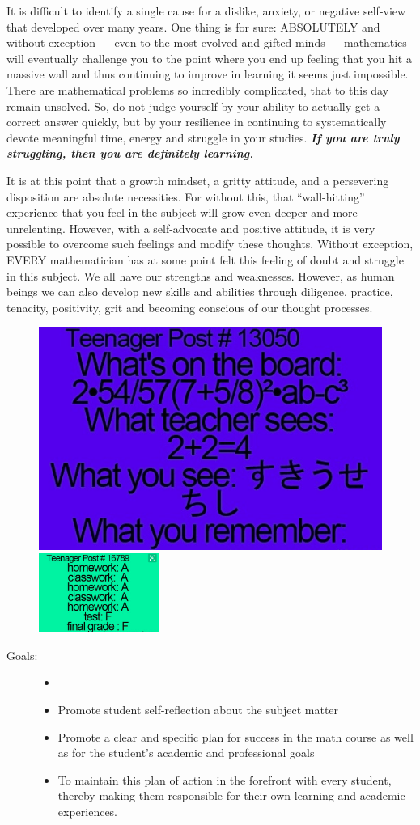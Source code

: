 \documentclass{article}
\begin{document}
It is difficult to identify a single cause for a dislike, anxiety, or negative self-view that developed over many years.  One thing is for sure: ABSOLUTELY and without exception --- even to the most evolved and gifted minds --- mathematics will eventually challenge you to the point where you end up feeling that you hit a massive wall and thus continuing to improve in learning it seems just impossible.  There are mathematical problems so incredibly complicated, that to this day remain unsolved.  So, do not judge yourself by your ability to actually get a correct answer quickly, but by your resilience in continuing to systematically devote meaningful time, energy and struggle in your studies.  \emph{\textbf{If you are truly struggling, then you are definitely learning.}}

It is at this point that a growth mindset, a gritty attitude, and a persevering disposition are absolute necessities. For without this, that “wall-hitting” experience that you feel in the subject will grow even deeper and more unrelenting.  However, with a self-advocate and positive attitude, it is very possible to overcome such feelings and modify these thoughts.  Without exception, EVERY mathematician has at some point felt this feeling of doubt and struggle in this subject.  We all have our strengths and weaknesses. However, as human beings we can also develop new skills and abilities through diligence, practice, tenacity, positivity, grit and becoming conscious of our thought processes.

\begin{figure}
  \includegraphics[width=.35\textwidth]{whatteachersees.png}

  \includegraphics[width=0.35\textwidth]{grades.png}
\end{figure}
\begin{description}
\item[Goals:]
  \begin{itemize}
  \item[]
  \item Promote student self-reflection about the subject matter
  \item Promote a clear and specific plan for success in the math course as well as for the student’s academic and professional goals
  \item To maintain this plan of action in the forefront with every student, thereby making them responsible for their own learning and academic experiences.
  \end{itemize}
\end{description}
\end{document}
